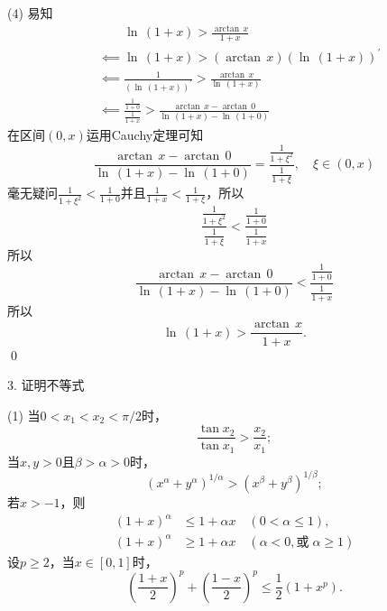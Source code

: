 (4) \prove 易知
\begin{align}
    &\mathrel{\phantom{\impliedby}} \ln \, \left(1+x\right) > \frac{\arctan \, x}{1+x} \\
    &\impliedby \ln \, \left(1+x\right) > \left(\arctan \, x\right) \left(\ln \, \left(1+x\right)\right)^\prime \\
    &\impliedby \frac{1}{\left(\ln \, \left(1+x\right)\right)^\prime} > \frac{\arctan \, x}{\ln \, \left(1+x\right)} \\
    &\impliedby \frac{\displaystyle\frac{1}{1+0}}{\displaystyle\frac{1}{1+x}} > \frac{\arctan \, x - \arctan \, 0}{\ln \, \left(1+x\right) - \ln \, \left(1+0\right)}
\end{align}
在区间$(0,x)$运用Cauchy定理可知
\begin{equation}
    \frac{\arctan \, x - \arctan \, 0}{\ln \, \left(1+x\right) - \ln \, \left(1+0\right)} = \frac{\displaystyle\frac{1}{1+\xi^2}}{\displaystyle\frac{1}{1+\xi}}, \quad \xi \in (0, x)
\end{equation}
毫无疑问$\displaystyle\frac{1}{1+\xi^2} < \displaystyle\frac{1}{1+0}$并且$\displaystyle\frac{1}{1+x}<\displaystyle\frac{1}{1+\xi}$，所以
\begin{equation}
    \displaystyle\frac{\displaystyle\frac{1}{1+\xi^2}}{\displaystyle\frac{1}{1+\xi}} < \displaystyle\frac{\displaystyle\frac{1}{1+0}}{\displaystyle\frac{1}{1+x}}
\end{equation}
所以
\begin{equation}
    \displaystyle\frac{\arctan \, x - \arctan \, 0}{\ln \, \left(1+x\right) - \ln \, \left(1+0\right)} < \displaystyle\frac{\displaystyle\frac{1}{1+0}}{\displaystyle\frac{1}{1+x}}
\end{equation}
所以
\begin{equation}
    \ln \, \left(1+x\right)>\frac{\arctan \, x}{1+x}.
\end{equation}
\qed\bigskip

3. 证明不等式
\begin{tasks}(1)
    \task 当$0<x_1<x_2<\pi/2$时，
    \begin{equation*}
        \frac{\tan x_2}{\tan x_1} > \frac{x_2}{x_1};
    \end{equation*}
    \task 当$x,y>0$且$\beta>\alpha>0$时，
    \begin{equation*}
        \left(x^\alpha + y^\alpha \right)^{1/\alpha} > \left(x^\beta + y^\beta\right)^{1/\beta};
    \end{equation*}
    \task 若$x>-1$，则
    \begin{align*}
        \left(1+x\right)^\alpha &\leq 1 + \alpha x \quad \left(0 < \alpha \leq 1\right), \\
        \left(1+x\right)^\alpha &\geq 1 + \alpha x \quad \left(\alpha < 0, \text{或} \; \alpha \geq 1\right)
    \end{align*}
    \task 设$p \geq 2$，当$x \in [0,1]$时，
    \begin{equation*}
        \left(\frac{1+x}{2}\right)^p + \left(\frac{1-x}{2}\right)^p \leq \frac{1}{2} \left(1+x^p\right).
    \end{equation*}
\end{tasks}


